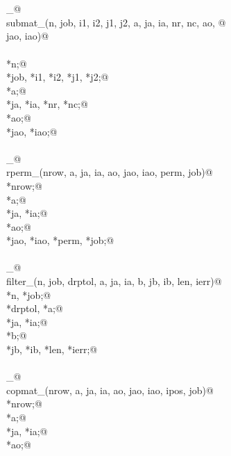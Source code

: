 \documentclass[12pt]{article}
\begin{document}
\begin{flushleft}
\begin{minipage}{\linewidth}
\begin{list}{}{}
\mbox{}\verb@@\\
\mbox{}\verb@@\\
\mbox{}\verb@submat_@\\
\mbox{}\verb@int submat_(n, job, i1, i2, j1, j2, a, ja, ia, nr, nc, ao, @\\
\mbox{}\verb@        jao, iao)@\\
\mbox{}\verb@@\\
\mbox{}\verb@integer *n;@\\
\mbox{}\verb@integer *job, *i1, *i2, *j1, *j2;@\\
\mbox{}\verb@doublereal *a;@\\
\mbox{}\verb@integer *ja, *ia, *nr, *nc;@\\
\mbox{}\verb@doublereal *ao;@\\
\mbox{}\verb@integer *jao, *iao;@\\
\mbox{}\verb@@\\
\mbox{}\verb@rperm_@\\
\mbox{}\verb@int rperm_(nrow, a, ja, ia, ao, jao, iao, perm, job)@\\
\mbox{}\verb@integer *nrow;@\\
\mbox{}\verb@doublereal *a;@\\
\mbox{}\verb@integer *ja, *ia;@\\
\mbox{}\verb@doublereal *ao;@\\
\mbox{}\verb@integer *jao, *iao, *perm, *job;@\\
\mbox{}\verb@@\\
\mbox{}\verb@filter_@\\
\mbox{}\verb@int filter_(n, job, drptol, a, ja, ia, b, jb, ib, len, ierr)@\\
\mbox{}\verb@integer *n, *job;@\\
\mbox{}\verb@doublereal *drptol, *a;@\\
\mbox{}\verb@integer *ja, *ia;@\\
\mbox{}\verb@doublereal *b;@\\
\mbox{}\verb@integer *jb, *ib, *len, *ierr;@\\
\mbox{}\verb@@\\
\mbox{}\verb@copmat_@\\
\mbox{}\verb@int copmat_(nrow, a, ja, ia, ao, jao, iao, ipos, job)@\\
\mbox{}\verb@integer *nrow;@\\
\mbox{}\verb@doublereal *a;@\\
\mbox{}\verb@integer *ja, *ia;@\\
\mbox{}\verb@doublereal *ao;@\\

\end{list}
\end{minipage}
\end{flushleft}
\end{document}
